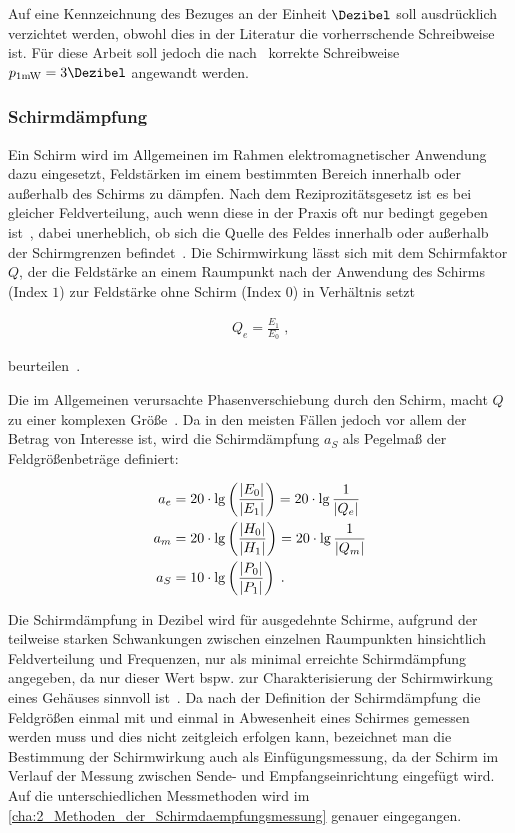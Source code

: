 Auf eine Kennzeichnung des Bezuges an der Einheit $\si{\Dezibel}$ soll ausdrücklich verzichtet werden, obwohl dies in der Literatur die vorherrschende Schreibweise ist. Für diese Arbeit soll jedoch die nach~\cite{IEC60027-3} korrekte Schreibweise $p_{1 \si{\milli\watt}} = 3 \si{\Dezibel}$ angewandt werden. 


\subsubsection{Schirmdämpfung}\label{cha:2_subsub_Schirmdaempfung}

Ein Schirm wird im Allgemeinen im Rahmen elektromagnetischer Anwendung dazu eingesetzt, Feldstärken im einem bestimmten Bereich innerhalb oder außerhalb des Schirms zu dämpfen. Nach dem Reziprozitätsgesetz ist es bei gleicher Feldverteilung, auch wenn diese in der Praxis oft nur bedingt gegeben ist~\cite{EMV-gerechtes_Geraetedesign}, dabei unerheblich, ob sich die Quelle des Feldes innerhalb oder außerhalb der Schirmgrenzen befindet~\cite{EM_Schirmung}. Die Schirmwirkung lässt sich mit dem Schirmfaktor $Q$, der die Feldstärke an einem Raumpunkt nach der Anwendung des Schirms (Index \glqq$1$\grqq) zur Feldstärke ohne Schirm (Index \glqq$0$\grqq) in Verhältnis setzt

\begin{align}
    Q_e = \frac{E_1}{E_0} \; \text{,}
\end{align}

beurteilen~\cite{EM_Schirmung}.
\par
\vspace{\linespace}
Die im Allgemeinen verursachte Phasenverschiebung durch den Schirm, macht $Q$ zu einer komplexen Größe~\cite{EM_Schirmung}. Da in den meisten Fällen jedoch vor allem der Betrag von Interesse ist, wird die Schirmdämpfung $a_S$ als Pegelmaß der Feldgrößenbeträge definiert:

\begin{align}
    a_e &= 20 \cdot \lg \left(\frac{\lvert E_0\rvert}{\lvert E_1\rvert}\right) = 20 \cdot \lg \frac{1}{\lvert Q_e\rvert} \\
    a_m &= 20 \cdot \lg \left(\frac{\lvert H_0\rvert}{\lvert H_1\rvert}\right) = 20 \cdot \lg \frac{1}{\lvert Q_m\rvert} \\
    a_S &= 10 \cdot \lg \left(\frac{\lvert P_0\rvert}{\lvert P_1\rvert}\right) \; \text{.}
\end{align}

Die Schirmdämpfung in Dezibel wird für ausgedehnte Schirme, aufgrund der teilweise starken Schwankungen zwischen einzelnen Raumpunkten hinsichtlich Feldverteilung und Frequenzen, nur als minimal erreichte Schirmdämpfung angegeben, da nur dieser Wert bspw. zur Charakterisierung der Schirmwirkung eines Gehäuses sinnvoll ist~\cite{EM_Schirmung}. Da nach der Definition der Schirmdämpfung die Feldgrößen einmal mit und einmal in Abwesenheit eines Schirmes gemessen werden muss und dies nicht zeitgleich erfolgen kann, bezeichnet man die Bestimmung der Schirmwirkung auch als Einfügungsmessung, da der Schirm im Verlauf der Messung zwischen Sende- und Empfangseinrichtung eingefügt wird. Auf die unterschiedlichen Messmethoden wird im \Abschnitt\ref{cha:2_Methoden_der_Schirmdaempfungsmessung} genauer eingegangen.


